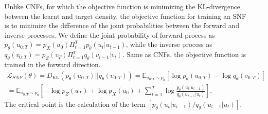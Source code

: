 Unlike \acp{CNF}, for which the objective function is minimizing the KL-divergence between the learnt and target density, the objective function for training an \ac{SNF} is to minimize the difference of the joint probabilities between the forward and inverse processes. We define the joint probability of forward process as $p_\theta(u_{0:T})=p_X(u_0)\Pi_{t=1}^{T}p_\theta(u_t|u_{t-1})$, while the inverse process as $q_\theta(v_{0:T})=p_Z(v_T)\Pi_{t=1}^{T}q_\theta(v_{t-1}|v_{t})$. Same as \acp{CNF}, the objective function is trained in the forward direction.
\begin{multline}
\mathcal{L}_{SNF}(\theta)=D_{\text{KL}}(p_\theta(u_{0:T})||q_\theta(v_{0:T}))=\mathbb{E}_{u_{0:T}\sim p_\theta}[\log p_\theta(u_{0:T})-\log q_\theta(v_{0:T})]\\
=\mathbb{E}_{u_{0:T}\sim p_\theta}[-\log p_Z(u_T)+\log p_X(u_0)+\sum_{t=1}^{T}\log \frac{p_\theta(u_{t}|u_{t-1})}{q_\theta(u_{t-1}|u_{t})}].
\end{multline}
The critical point is the calculation of the term $\left[p_\theta(u_{t}|u_{t-1})/q_\theta(u_{t-1}|u_{t})\right]$.
